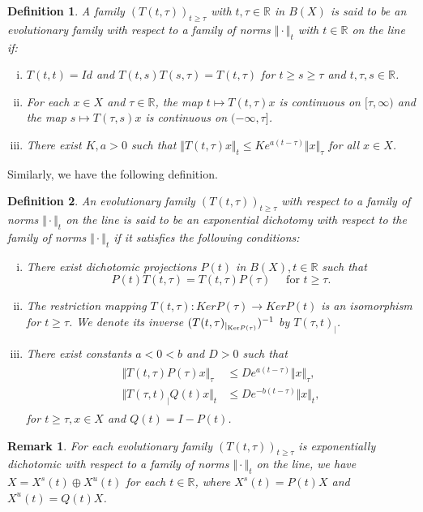 \documentclass[reqno]{amsart}
\newtheorem{definition}{Definition}[section]
\newtheorem{remark}{Remark}[section]
\def\r{\mathbb{R}}
\begin{document}
\begin{definition} \label{dn:2.1}
 A family $\left( T(t,\tau)\right)_{t \geq \tau}$ with $t,\tau \in \mathbb{R}$ in $B(X)$ is said to be an evolutionary family with respect to a family of norms $\Vert \cdot\Vert _t$ with $t\in \r$ on the line if:
\begin{enumerate}[i.]
\item $T(t,t)=Id$  and $T(t,s)T(s,\tau)=T(t,\tau)$ for $t \geq s \geq \tau $ and $t,\tau,s \in \mathbb{R}$.
\item For each $x \in X $ and $\tau \in \r$,  the map  $t \mapsto T(t,\tau)x$  is continuous on $[\tau, \infty)$
and the map $s\mapsto T(\tau,s)x$ is continuous on $(-\infty,\tau]$.
\item There exist $K,a>0$ such that $\Vert T(t,\tau)x \Vert _t \leq Ke^{a(t-\tau)}\Vert x\Vert _{\tau}$ for all $x\in X$.
\end{enumerate}
\end{definition}

Similarly, we have the following definition.
\begin{definition}
An evolutionary family $\left( T(t,\tau)\right)_{t \geq \tau}$ with respect to a family of norms $\Vert \cdot\Vert _t$ on the line is said to be an exponential dichotomy with respect to the family of norms $\Vert \cdot\Vert _t$ if it satisfies the following conditions:
\begin{enumerate}[i.]
\item There exist dichotomic projections $P(t)$ in $B(X), t \in \mathbb{R}$ such that 
\begin{equation*}
P(t)T(t,\tau)=T(t,\tau)P(\tau) \quad \text{ for } t\geq \tau. 
\end{equation*}
\item The restriction mapping  
$T(t,\tau): Ker P(\tau) \rightarrow Ker P(t) $
is an isomorphism for $t \geq \tau$. We denote its inverse $(T(t,\tau)_{|_{\text{\rm Ker}P(\tau)}})^{-1}$ by $T(\tau,t)_|$.
\item There exist constants $a<0<b$ and $D>0$ such that
\begin{align}
\begin{split}
\Vert T(t,\tau)P(\tau)x \Vert _{\tau} &\leq De^{a(t-\tau)}\Vert x\Vert _{\tau},\\
\Vert T(\tau,t)_| Q(t)x \Vert _{t} &\leq De^{-b(t-\tau)}\Vert x\Vert _{t},
\end{split} \label{2.6}
\end{align}
for $t \geq \tau, x\in X$ and $Q(t)=I-P(t)$.
\end{enumerate}
\end{definition}
\begin{remark}\label{re1}
For each evolutionary family $\left( T(t,\tau)\right)_{t \geq \tau}$ is exponentially dichotomic with respect to a family of norms $\Vert \cdot\Vert _t$ on the line, we have $X=X^s(t) \oplus X^u(t)$ for each $t\in \r$, where $X^s(t)=P(t)X$ and $X^u(t)=Q(t)X$.
\end{remark}
\end{document}
